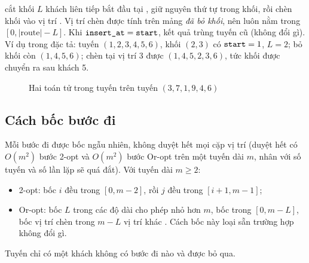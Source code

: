  cắt khối $L$ khách liên tiếp bắt đầu tại , giữ
nguyên thứ tự trong khối, rồi chèn khối vào vị trí . Vị trí chèn được tính trên mảng
\emph{đã bỏ khối}, nên luôn nằm trong $[0, |\text{route}| - L]$. Khi $\texttt{insert\_at} = \texttt{start}$,
kết quả trùng tuyến cũ (không đổi gì). Ví dụ trong đặc tả: tuyến $(1,2,3,4,5,6)$, khối $(2,3)$ có
$\texttt{start}=1$, $L=2$; bỏ khối còn $(1,4,5,6)$; chèn tại vị trí 3 được $(1,4,5,2,3,6)$, tức khối được
chuyển ra sau khách 5.

\begin{figure}[H]
\centering
{}
\caption{Hai toán tử trong tuyến trên tuyến $(3,7,1,9,4,6)$}
\label{fig:ops}
\end{figure}

\subsection{Cách bốc bước đi}

Mỗi bước đi được bốc ngẫu nhiên, không duyệt hết mọi cặp vị trí (duyệt hết có $O(m^2)$ bước 2-opt và
$O(m^2)$ bước Or-opt trên một tuyến dài $m$, nhân với số tuyến và số lần lặp sẽ quá đắt). Với tuyến dài
$m \ge 2$:
\begin{itemize}
  \item 2-opt: bốc $i$ đều trong $[0, m-2]$, rồi $j$ đều trong $[i+1, m-1]$;
  \item Or-opt: bốc $L$ trong các độ dài cho phép nhỏ hơn $m$, bốc  trong $[0, m-L]$, bốc
        vị trí chèn trong $m - L$ vị trí khác . Cách bốc này loại sẵn trường hợp không đổi gì.
\end{itemize}
Tuyến chỉ có một khách không có bước đi nào và được bỏ qua.

